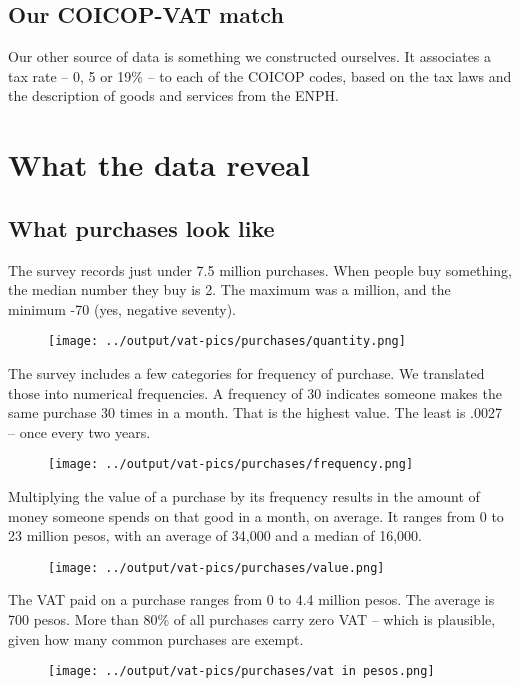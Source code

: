 \documentclass[preprint,12pt]{elsarticle}
\begin{document}
\subsection{Our COICOP-VAT match}

Our other source of data is something we constructed ourselves. It associates a tax rate -- 0, 5 or 19\% -- to each of the COICOP codes, based on the tax laws and the description of goods and services from the ENPH.

\section{What the data reveal}

\subsection{What purchases look like}

The survey records just under 7.5 million purchases. When people buy something, the median number they buy is 2. The maximum was a million, and the minimum -70 (yes, negative seventy).
\begin{figure}[t]
\centering\texttt{[image: ../output/vat-pics/purchases/quantity.png]}
\end{figure}

The survey includes a few categories for frequency of purchase. We translated those into numerical frequencies. A frequency of 30 indicates someone makes the same purchase 30 times in a month. That is the highest value. The least is .0027 -- once every two years.
\begin{figure}[t]
\centering\texttt{[image: ../output/vat-pics/purchases/frequency.png]}
\end{figure}

Multiplying the value of a purchase by its frequency results in the amount of money someone spends on that good in a month, on average. It ranges from 0 to 23 million pesos, with an average of 34,000 and a median of 16,000.
\begin{figure}[t]
\centering\texttt{[image: ../output/vat-pics/purchases/value.png]}
\end{figure}

The VAT paid on a purchase ranges from 0 to 4.4 million pesos. The average is 700 pesos. More than 80\% of all purchases carry zero VAT -- which is plausible, given how many common purchases are exempt.
\begin{figure}[t]
\centering\texttt{[image: ../output/vat-pics/purchases/vat in pesos.png]}
\end{figure}
\end{document}
